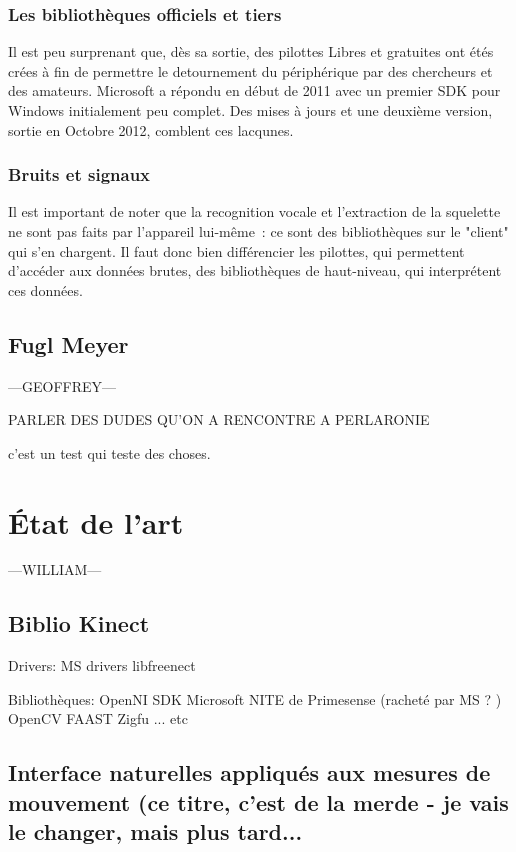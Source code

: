 \documentclass{report}
\begin{document}
		\subsection{Les bibliothèques officiels et tiers}
		Il est peu surprenant que, dès sa sortie, des pilottes Libres et gratuites 
		ont étés crées à fin de permettre le detournement du périphérique par des
		chercheurs et des amateurs. Microsoft a répondu en début de 2011 avec un
		premier SDK pour Windows initialement peu complet. Des mises à jours et une 
		deuxième version, sortie en Octobre 2012, comblent ces lacqunes.
		
		\subsection{Bruits et signaux}
		Il est important de noter que la recognition vocale et l'extraction de la
		squelette ne sont pas faits par l'appareil lui-même~: ce sont des 
		bibliothèques sur le "client" qui s'en chargent. Il faut donc bien 
		différencier les pilottes, qui permettent d'accéder aux données brutes, des
		bibliothèques de haut-niveau, qui interprétent ces données.
		
		
		
		\section{Fugl Meyer} 		---GEOFFREY---
		
		PARLER DES DUDES QU'ON A RENCONTRE A PERLARONIE
		
		
		c'est un test qui teste des choses.
		
	\chapter{État de l'art} 		---WILLIAM---
	

	
		\section{Biblio Kinect}
		
		Drivers:
		MS drivers
		libfreenect
		
		Bibliothèques:
		OpenNI
		SDK Microsoft
		NITE de Primesense (racheté par MS ? )
		OpenCV
		FAAST
		Zigfu
		... etc
		
		
		\section{Interface naturelles appliqués aux mesures de mouvement 
		(ce titre, c'est de la merde - je vais le changer, mais plus tard...}
\end{document}

